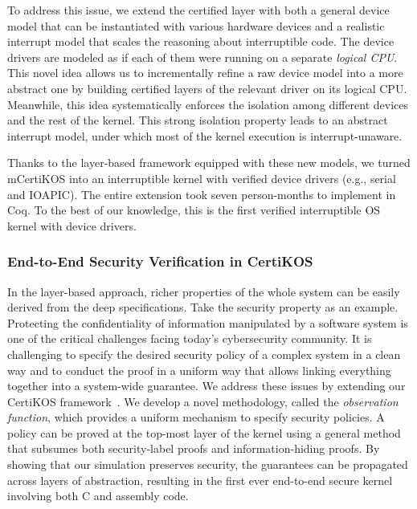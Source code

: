 \documentclass[a4paper, 10pt]{article}
\begin{document}
\begin{small}
To address this issue, we extend the certified layer with
both a general device model that can be
instantiated with various hardware devices and a realistic
interrupt model that scales the reasoning
about interruptible code. 
The device drivers are modeled
as if each of them were running on a  separate \emph{logical CPU}. This novel idea allows us to
incrementally refine a raw
device model into a more abstract one
by building certified layers of the relevant driver on its logical CPU.
Meanwhile, this idea systematically enforces
the isolation among different devices and the
rest of the kernel. This strong isolation property 
leads to an abstract interrupt model, under which
most of the kernel execution is interrupt-unaware.

Thanks to the layer-based framework equipped with these new models,
we turned mCertiKOS
into an  interruptible kernel with verified  device
drivers (e.g., serial and IOAPIC). 
The entire extension  took  seven person-months
to implement in Coq.
To the best of our knowledge, this is the first verified
interruptible OS kernel with device drivers.

\subsubsection*{\small End-to-End Security Verification in CertiKOS}
In the layer-based approach, richer properties of the whole system can be
easily derived  from the deep specifications.
Take the security property as an example.
Protecting the confidentiality of information manipulated by
a software system is one of the critical challenges
facing today's cybersecurity community. 
It is  challenging to specify the desired security policy
of a complex system in a clean way
and to conduct the proof in a uniform way
that allows linking everything together into
a system-wide guarantee.
We address these issues by extending our CertiKOS framework~\cite{pldi16-security}. 
We develop a novel
methodology, called the \emph{observation function}, 
which provides a  uniform mechanism
to specify  security policies.
A policy can be proved at the top-most layer of the kernel
 using a general method that subsumes both security-label proofs and
information-hiding proofs.
By showing that our simulation preserves security,
the guarantees can be propagated across layers of abstraction,
 resulting in
the first ever end-to-end secure kernel involving both C and assembly code.

\begin{comment}
 and using a special
kind of simulation that is guaranteed to preserve security


\end{comment}
\end{small}
\end{document}
